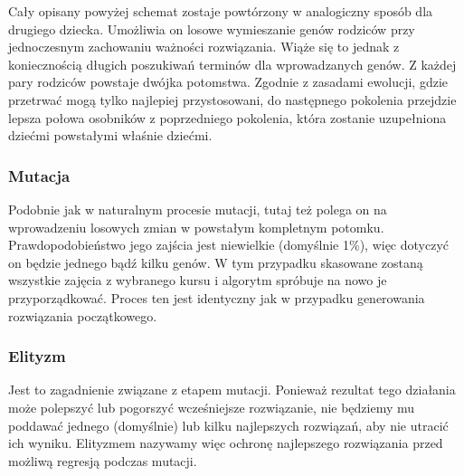 \par Cały opisany powyżej schemat zostaje powtórzony w analogiczny sposób dla drugiego dziecka. Umożliwia on losowe wymieszanie genów rodziców przy jednoczesnym zachowaniu ważności rozwiązania. Wiąże się to jednak z koniecznością długich poszukiwań terminów dla wprowadzanych genów. Z każdej pary rodziców powstaje dwójka potomstwa. Zgodnie z zasadami ewolucji, gdzie przetrwać mogą tylko najlepiej przystosowani, do następnego pokolenia przejdzie lepsza połowa osobników z poprzedniego pokolenia, która zostanie uzupełniona dziećmi powstałymi właśnie dziećmi.
\subsubsection{Mutacja}
Podobnie jak w naturalnym procesie mutacji, tutaj też polega on na wprowadzeniu losowych zmian w powstałym kompletnym potomku. Prawdopodobieństwo jego zajścia jest niewielkie (domyślnie 1\%), więc dotyczyć on będzie jednego bądź kilku genów. W tym przypadku skasowane zostaną wszystkie zajęcia z wybranego kursu i algorytm spróbuje na nowo je przyporządkować. Proces ten jest identyczny jak w przypadku generowania rozwiązania początkowego.
\subsubsection{Elityzm}
\par Jest to zagadnienie związane z etapem mutacji. Ponieważ rezultat tego działania może polepszyć lub pogorszyć wcześniejsze rozwiązanie, nie będziemy mu poddawać jednego (domyślnie) lub kilku najlepszych rozwiązań, aby nie utracić ich wyniku. Elityzmem nazywamy więc ochronę najlepszego rozwiązania przed możliwą regresją podczas mutacji.
